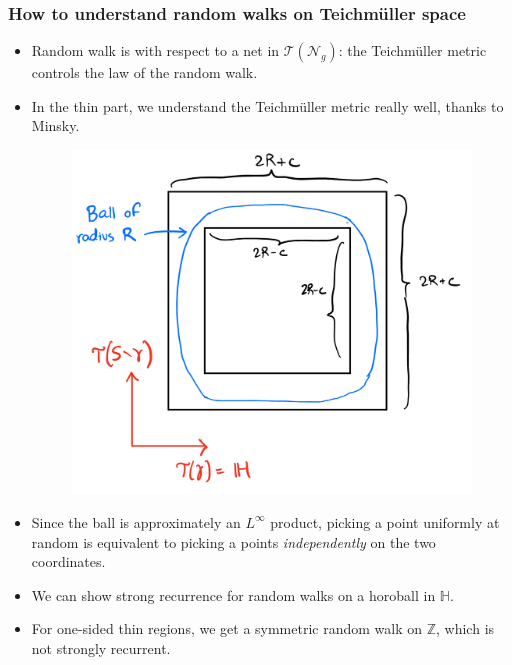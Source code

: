 \documentclass[8pt]{beamer}
\newcommand{\no}{\mathcal{N}}
\newcommand{\teich}{\mathcal{T}}
\begin{document}
\begin{frame}
  \frametitle{How to understand random walks on Teichmüller space}
  \begin{itemize}
  \item<2-> Random walk is with respect to a net in $\teich(\no_g)$: the Teichmüller metric controls the law of the random walk.
  \item<3-> In the thin part, we understand the Teichmüller metric really well, thanks to Minsky.
     {
      \begin{figure}[h]
        \centering
        \includegraphics[scale=0.1]{minsky.png}
      \end{figure}
    }
  \item<5-> Since the ball is approximately an $L^{\infty}$ product, picking a point uniformly at random is equivalent to picking a points \emph{independently} on the two coordinates.
  \item<6-> We can show strong recurrence for random walks on a horoball in $\mathbb{H}$.
  \item<7-> For one-sided thin regions, we get a symmetric random walk on $\mathbb{Z}$, which is not strongly recurrent.
  \end{itemize}
\end{frame}
\end{document}
